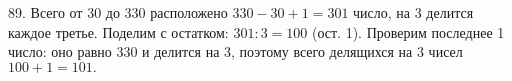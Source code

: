 89. Всего от 30 до 330 расположено $330-30+1=301$ число, на 3 делится каждое третье. Поделим с остатком: $301:3=100$ (ост. 1). Проверим последнее 1 число: оно равно 330 и делится на 3, поэтому всего делящихся на 3 чисел $100+1=101.$\\
